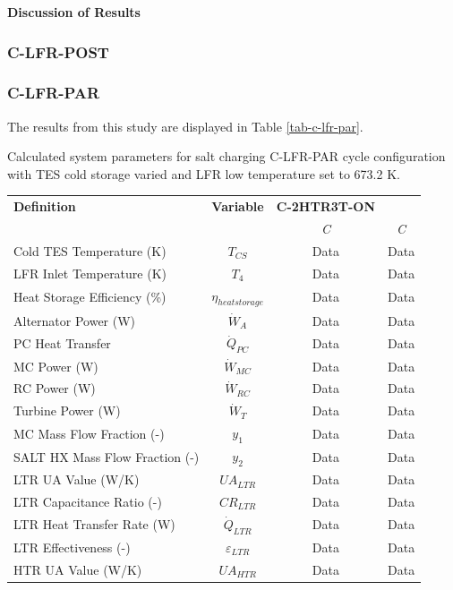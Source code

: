 \begin{paracol}{2}
\textbf{Discussion of Results}

\subsubsection{C-LFR-POST}


\subsubsection{C-LFR-PAR}

The results from this study are displayed in Table \ref{tab-c-lfr-par}.

\begin{specialtable}[htbp]
    \caption{Calculated system parameters for salt charging C-LFR-PAR cycle configuration with TES cold storage varied and LFR low temperature set to 673.2 K.\label{tab-c-lfr-par}}
    \begin{tabular}{lccc}
    \toprule
    \textbf{Definition} & \textbf{Variable} & \textbf{C-2HTR3T-ON} & \\
    & & \textit{C} & \textit{C}\\
    \midrule	
    Cold TES Temperature (K)	&	$T_{CS}$	&	Data	&	Data	\\
    LFR Inlet Temperature (K)	&	$T_{4}$	&	Data	&	Data	\\
    Heat Storage Efficiency (\%)	&	$\eta_{heatstorage}$	&	Data	&	Data	\\
    Alternator Power (W)	&	$\dot{W}_{A}$	&	Data	&	Data	\\
    PC Heat Transfer	&	$\dot{Q}_{PC}$	&	Data	&	Data	\\
    MC Power (W)	&	$\dot{W}_{MC}$	&	Data	&	Data	\\
    RC Power (W)	&	$\dot{W}_{RC}$	&	Data	&	Data	\\
    Turbine Power (W)	&	$\dot{W}_{T}$	&	Data	&	Data	\\
    MC Mass Flow Fraction (-)	&	$y_{1}$	&	Data	&	Data	\\
    SALT HX Mass Flow Fraction (-)	&	$y_{2}$	&	Data	&	Data	\\
    LTR UA Value (W/K)	&	$UA_{LTR}$	&	Data	&	Data	\\
    LTR Capacitance Ratio (-)	&	$CR_{LTR}$	&	Data	&	Data	\\
    LTR Heat Transfer Rate (W)	&	$\dot{Q}_{LTR}$	&	Data	&	Data	\\
    LTR Effectiveness (-)	&	$\varepsilon_{LTR}$	&	Data	&	Data	\\
    HTR UA Value (W/K)	&	$UA_{HTR}$	&	Data	&	Data	\\

\end{tabular}
\end{specialtable}
\end{paracol}
